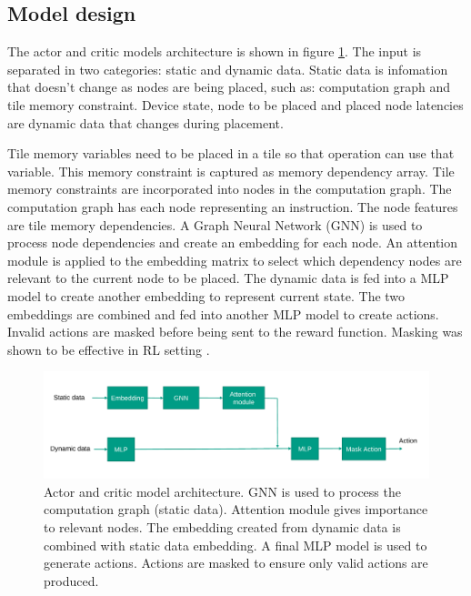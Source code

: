 \subsection{Model design}

The actor and critic models architecture is shown in figure \ref{fig:model}. 
The input is separated in two categories: static and dynamic data. 
Static data is infomation that doesn't change as nodes are being placed, such as: computation graph and tile memory constraint.
Device state, node to be placed and placed node latencies are dynamic data that changes during placement.

Tile memory variables need to be placed in a tile so that operation can use that variable. This memory constraint is captured as 
memory dependency array. Tile memory constraints are incorporated into nodes in the computation graph. The computation graph 
has each node representing an instruction. The node features are tile memory dependencies. A Graph Neural Network (GNN) is 
used to process node dependencies and create an embedding for each node. An attention module is applied to the embedding matrix 
to select which dependency nodes are relevant to the current node to be placed. The dynamic data is fed into a MLP model to 
create another embedding to represent current state. The two embeddings are combined and fed into another MLP model to 
create actions. Invalid actions are masked before being sent to the reward function. Masking was shown to be effective in RL setting \cite{Shengyi_mask}.

\begin{figure}[h]
  \centering
  \includegraphics[width=\linewidth]{fig/model.pdf}
  \caption{Actor and critic model architecture. GNN is used to process the computation graph (static data). 
  Attention module gives importance to relevant nodes. The embedding created from dynamic data is combined with static data embedding. 
  A final MLP model is used to generate actions. Actions are masked to ensure only valid actions are produced. }
  \label{fig:model}
\end{figure}

